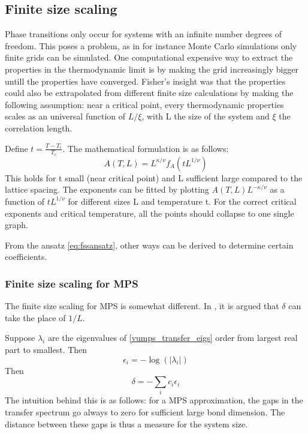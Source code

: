 \subsection{Finite size scaling}\label{subsec:fss}

Phase transitions only occur for systems with an infinite number degrees of freedom. This poses a problem, as in for instance Monte Carlo simulations only finite grids can be simulated. One computational expensive way to extract the properties in the thermodynamic limit is by making the grid increasingly bigger untill the properties have converged. Fisher's insight was that the properties could also be extrapolated from different finite size calculations by making the following assumption: near a critical point, every thermodynamic properties scales as an universal function of $L/\xi$, with L the size of the system and $\xi$ the correlation length.

Define $t=\frac{T-T_c}{T_c}$. The mathematical formulation is as follows:
\begin{equation}\label{eq:fssansatz}
    A(T,L) = L^{\kappa / \nu} f_A( t L ^{1/ \nu} )
\end{equation}
This holds for t small (near critical point) and L sufficient large compared to the lattice spacing. The exponents can be fitted by plotting $A(T,L)  L^{-\kappa / \nu} $ as a function of $t L ^{1/ \nu}$ for different sizes L and temperature t. For the correct critical exponents and critical temperature, all the points should collapse to one single graph.

From the ansatz \cref{eq:fssansatz}, other ways can be derived to determine certain coefficients.

\subsubsection{Finite size scaling for MPS}

The finite size scaling for MPS is somewhat different. In \cite{Vanhecke2019}, it is argued that $\delta$ can take the place of $1/L$.

Suppose $\lambda_i$ are the eigenvalues of \cref{vumps_transfer_eigs} order from largest real part to smallest. Then
\begin{equation}
    \epsilon_i = - \log( \left | \lambda_i  \right |  )
\end{equation}
Then
\begin{equation}
    \delta = - \sum_i c_i \epsilon_i
\end{equation}
The intuition behind this is as follows: for a MPS approximation, the gaps in the transfer spectrum go always to zero for sufficient large bond dimension. The distance between these gaps is thus a measure for the system size.

